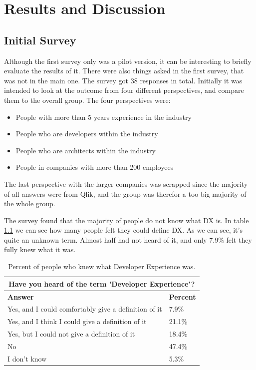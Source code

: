 \documentclass{cslthse-msc}
\begin{document}
    \chapter{Results and Discussion}

    \section{Initial Survey}
    Although the first survey only was a pilot version, it can be interesting to briefly evaluate the results of it. There were also things asked in the first survey, that was not in the main one. The survey got 38 responses in total.
    Initially it was intended to look at the outcome from four different perspectives, and compare them to the overall group. The four perspectives were:
    \begin{itemize}[label={}]
        \item People with more than 5 years experience in the industry
        \item People who are developers within the industry
        \item People who are architects within the industry
        \item People in companies with more than 200 employees
    \end{itemize}
    The last perspective with the larger companies was
    scrapped since the majority of all answers were from Qlik, and the group
    was therefor a too big majority of the whole group.

    The survey found that the majority of people do not know what DX is. In table \ref{tab:knowdx} we can see how many people felt they could define DX. As we can see, it's quite an unknown term. Almost half had not heard of it, and only 7.9\% felt they fully knew what it was.

    \begin{table}[H]
        \centering
        \caption{Percent of people who knew what Developer Experience was.}
        \label{tab:knowdx}
        \begin{tabularx}{\columnwidth}{X|l}
            \multicolumn{2}{c}{\textbf{Have you heard of the term 'Developer Experience'?}} \\ \hline \hline
            \textbf{Answer} & \textbf{Percent} \\ \hline
            Yes, and I could comfortably give a definition of it & 7.9\%  \\ \hline
            Yes, and I think I could give a definition of it & 	21.1\%  \\ \hline
            Yes, but I could not give a definition of it &	18.4\%  \\ \hline
            No &	47.4\%  \\ \hline
            I don't know & 5.3\% \\ \hline
        \end{tabularx}
    \end{table}
\end{document}
